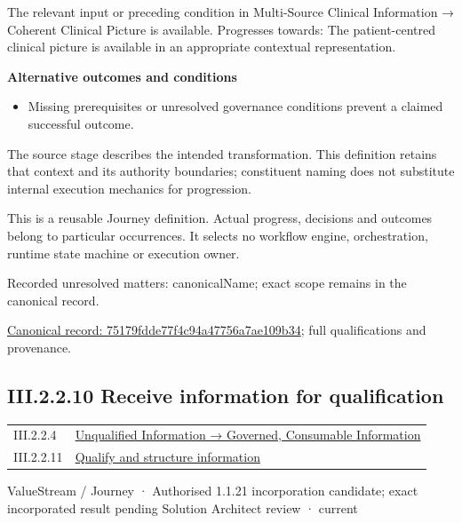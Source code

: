 The relevant input or preceding condition in Multi-Source Clinical Information → Coherent Clinical Picture is available. Progresses towards: The patient-centred clinical picture is available in an appropriate contextual representation.



\par\medskip\textbf{Alternative outcomes and conditions}\par


\begin{itemize}


\item Missing prerequisites or unresolved governance conditions prevent a claimed successful outcome.

\end{itemize}


The source stage describes the intended transformation. This definition retains that context and its authority boundaries; constituent naming does not substitute internal execution mechanics for progression.



This is a reusable Journey definition. Actual progress, decisions and outcomes belong to particular occurrences. It selects no workflow engine, orchestration, runtime state machine or execution owner.


{\small Recorded unresolved matters: canonicalName; exact scope remains in the canonical record.}\par
{\footnotesize \href{../../../../continuum/strategy/value-stream/75179fdde77f4c94a47756a7ae109b34.md}{Canonical record: 75179fdde77f4c94a47756a7ae109b34}; full qualifications and provenance.}\par
\subsection*{III.2.2.10 Receive information for qualification}
\label{navigation:III.2.2.10}

\begin{longtable}{p{.22\linewidth}p{.73\linewidth}}
III.2.2.4 & \hyperref[element:02e036f18bab400bac261007e39457ee]{Unqualified Information → Governed, Consumable Information} \\
III.2.2.11 & \hyperref[element:cbedc98406674727a9b1eae8d9bc30da]{Qualify and structure information} \\
\end{longtable}
\label{element:28544771580448638e209bb377a25fbe}
{\small ValueStream / Journey · Authorised 1.1.21 incorporation candidate; exact incorporated result pending Solution Architect review · current}\par

